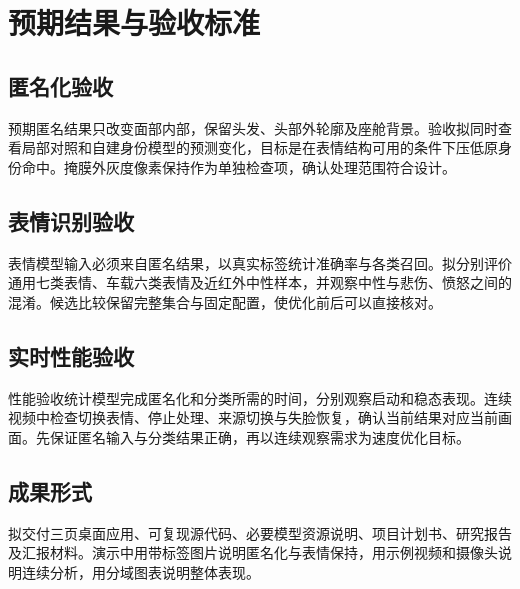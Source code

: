\section{预期结果与验收标准}
\label{sec:results}
\subsection{匿名化验收}
预期匿名结果只改变面部内部，保留头发、头部外轮廓及座舱背景。验收拟同时查看局部对照和自建身份模型的预测变化，目标是在表情结构可用的条件下压低原身份命中。掩膜外灰度像素保持作为单独检查项，确认处理范围符合设计。

\subsection{表情识别验收}
表情模型输入必须来自匿名结果，以真实标签统计准确率与各类召回。拟分别评价通用七类表情、车载六类表情及近红外中性样本，并观察中性与悲伤、愤怒之间的混淆。候选比较保留完整集合与固定配置，使优化前后可以直接核对。

\subsection{实时性能验收}
性能验收统计模型完成匿名化和分类所需的时间，分别观察启动和稳态表现。连续视频中检查切换表情、停止处理、来源切换与失脸恢复，确认当前结果对应当前画面。先保证匿名输入与分类结果正确，再以连续观察需求为速度优化目标。

\subsection{成果形式}
拟交付三页桌面应用、可复现源代码、必要模型资源说明、项目计划书、研究报告及汇报材料。演示中用带标签图片说明匿名化与表情保持，用示例视频和摄像头说明连续分析，用分域图表说明整体表现。
